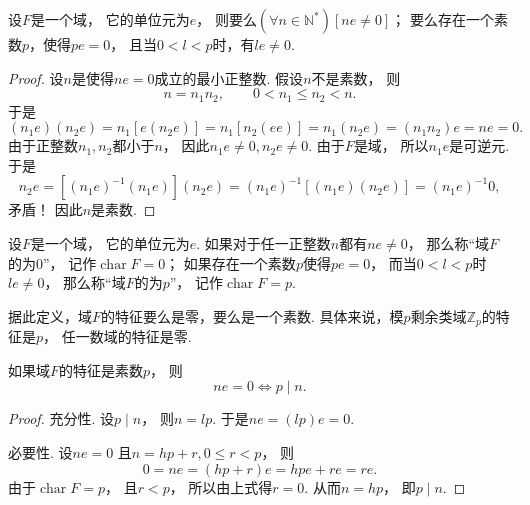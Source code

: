 \begin{theorem}
设\(F\)是一个域，
它的单位元为\(e\)，
则要么\((\forall n\in\mathbb{N}^*)[ne\neq0]\)；
要么存在一个素数\(p\)，使得\(pe=0\)，
且当\(0<l<p\)时，有\(le\neq0\).
\begin{proof}
设\(n\)是使得\(ne=0\)成立的最小正整数.
假设\(n\)不是素数，
则\[
	n=n_1 n_2,
	\qquad
	0<n_1 \leq n_2<n.
\]
于是%
\[
	(n_1 e)(n_2 e)
	=n_1[e(n_2 e)]
	=n_1[n_2(ee)]
	=n_1(n_2 e)
	=(n_1 n_2)e
	=ne=0.
\]
由于正整数\(n_1,n_2\)都小于\(n\)，
因此\(n_1 e\neq0,
n_2 e\neq0\).
由于\(F\)是域，
所以\(n_1 e\)是可逆元.
于是\[
	n_2 e
	=[(n_1 e)^{-1} (n_1 e)](n_2 e)
	=(n_1 e)^{-1}
	[(n_1 e)(n_2 e)]
	=(n_1 e)^{-1} 0,
\]
矛盾！
因此\(n\)是素数.
\end{proof}
\end{theorem}

\def\FieldChar{\operatorname{char}}%
\begin{definition}
设\(F\)是一个域，
它的单位元为\(e\).
如果对于任一正整数\(n\)都有\(ne\neq0\)，
那么称“域\(F\)的为0”，
记作\(\FieldChar F=0\)；
如果存在一个素数\(p\)使得\(pe=0\)，
而当\(0<l<p\)时\(le\neq0\)，
那么称“域\(F\)的为\(p\)”，
记作\(\FieldChar F=p\).
\end{definition}

据此定义，域\(F\)的特征要么是零，要么是一个素数.
具体来说，模\(p\)剩余类域\(\mathbb{Z}_p\)的特征是\(p\)，
任一数域的特征是零.

\begin{corollary}
如果域\(F\)的特征是素数\(p\)，
则\[
	ne=0
	\iff
	p \mid n.
\]
\begin{proof}
充分性.
设\(p \mid n\)，
则\(n=lp\).
于是\(ne
=(lp)e
=0\).

必要性.
设\(ne=0\)
且\(n=hp+r,0\leq r<p\)，
则\[
	0=ne
	=(hp+r)e
	=hpe+re
	=re.
\]
由于\(\FieldChar F=p\)，
且\(r<p\)，
所以由上式得\(r=0\).
从而\(n=hp\)，
即\(p \mid n\).
\end{proof}
\end{corollary}
